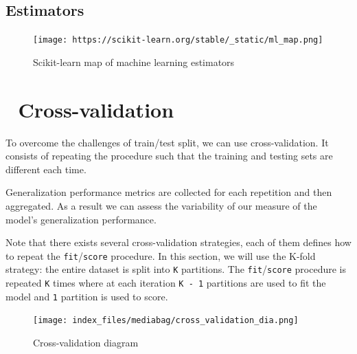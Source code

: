 \documentclass[
  letterpaper,
  DIV=11,
  numbers=noendperiod,
  oneside]{scrreprt}
\begin{document}
\hypertarget{estimators}{%
\section{Estimators}\label{estimators}}

\begin{figure}

{\centering \texttt{[image: https://scikit-learn.org/stable/\_static/ml\_map.png]}

}

\caption{Scikit-learn map of machine learning estimators}

\end{figure}

\hypertarget{cross-validation}{%
\chapter{\texorpdfstring{{📙}
Cross-validation}{📙 Cross-validation}}\label{cross-validation}}

To overcome the challenges of train/test split, we can use
cross-validation. It consists of repeating the procedure such that the
training and testing sets are different each time.

Generalization performance metrics are collected for each repetition and
then aggregated. As a result we can assess the variability of our
measure of the model's generalization performance.

Note that there exists several cross-validation strategies, each of them
defines how to repeat the \texttt{fit}/\texttt{score} procedure. In this
section, we will use the K-fold strategy: the entire dataset is split
into \texttt{K} partitions. The \texttt{fit}/\texttt{score} procedure is
repeated \texttt{K} times where at each iteration \texttt{K\ -\ 1}
partitions are used to fit the model and \texttt{1} partition is used to
score.

\begin{figure}

{\centering \texttt{[image: index\_files/mediabag/cross\_validation\_dia.png]}

}

\caption{Cross-validation diagram}

\end{figure}
\end{document}
